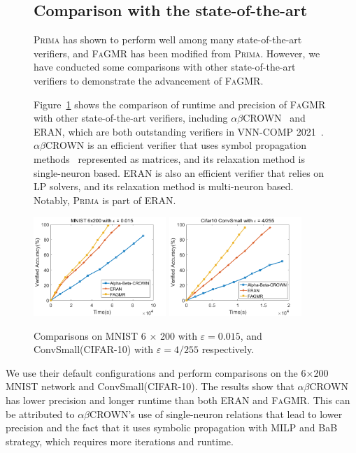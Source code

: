 \documentclass[runningheads]{llncs}
\newcommand{\ourtool}{\textsc{FaGMR}\xspace}
\newcommand{\prima}{\textsc{Prima}\xspace}
\newcommand{\mnist}{MNIST\xspace}
\newcommand{\cifar}{CIFAR-10\xspace}
\newcommand{\eran}{\textsc{ERAN}\xspace}
\newcommand{\abcrown}{\textsc{$\alpha$$\beta$CROWN}\xspace}
\begin{document}
\begin{figure}  

\subsection{Comparison with the state-of-the-art}

\prima has shown to perform well among many state-of-the-art verifiers, and \ourtool has been modified from \prima. However, we have conducted some comparisons with other state-of-the-art verifiers to demonstrate the advancement of \ourtool.

Figure~\ref{comparison} shows the comparison of runtime and precision of \ourtool with other state-of-the-art verifiers, including \abcrown~\cite{DBLP:conf/iclr/XuZ0WJLH21} and \eran, which are both outstanding verifiers in VNN-COMP 2021~\cite{DBLP:journals/corr/abs-2109-00498}. \abcrown is an efficient verifier that uses symbol propagation methods~\cite{DBLP:conf/nips/ZhangWCHD18} represented as matrices, and its relaxation method is single-neuron based. \eran is also an efficient verifier that relies on LP solvers, and its relaxation method is multi-neuron based. Notably, \prima is part of \eran.
\begin{center}
\includegraphics[width=5cm]{figures/state_6x200_0.015_mnist}
\includegraphics[width=5cm]{figures/state_convsmall_4255_cifar10.png}  
\caption{Comparisons on \mnist 6 $\times$ 200 with $\varepsilon=0.015$, 
and ConvSmall(\cifar) with $\varepsilon=4/255$ respectively.}
\label{comparison}
\end{center}
\end{figure}
We use their default configurations and perform comparisons on the 6$\times$200 \mnist network and ConvSmall(\cifar). The results show that \abcrown has lower precision and longer runtime than both \eran and \ourtool. This can be attributed to \abcrown's use of single-neuron relations that lead to lower precision and the fact that it uses symbolic propagation with MILP and BaB strategy, which requires more iterations and runtime. 
\end{document}
